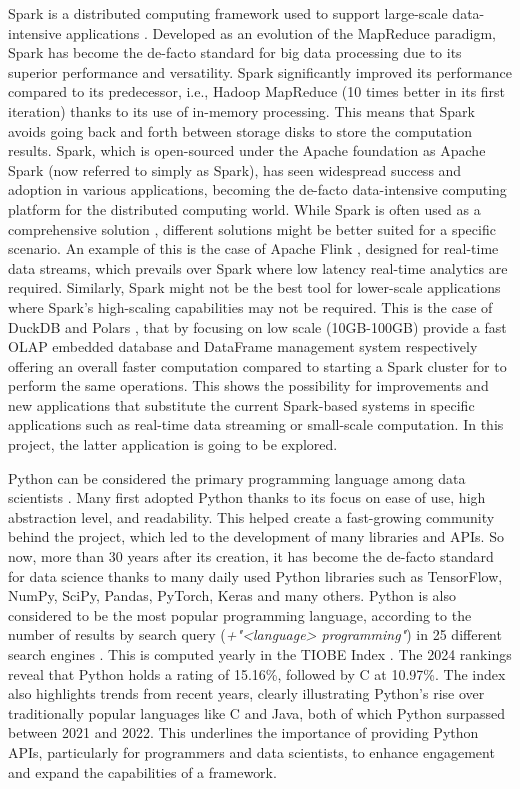 Spark is a distributed computing framework used to support large-scale data-intensive applications \cite{zaharia2010spark}. Developed as an evolution of the MapReduce paradigm, Spark has become the de-facto standard for big data processing due to its superior performance and versatility. Spark significantly improved its performance compared to its predecessor, i.e., Hadoop MapReduce (10 times better in its first iteration) \cite{zaharia2010spark} thanks to its use of in-memory processing. This means that Spark avoids going back and forth between storage disks to store the computation results. Spark, which is open-sourced under the Apache foundation as Apache Spark \cite{ApacheSparkUnified} (now referred to simply as Spark), has seen widespread success and adoption in various applications, becoming the de-facto data-intensive computing platform for the distributed computing world. While Spark is often used as a comprehensive solution \cite{zahariaApacheSparkUnified2016}, different solutions might be better suited for a specific scenario.
An example of this is the case of Apache Flink \cite{carboneApacheFlinkStream}, designed for real-time data streams, which prevails over Spark where low latency real-time analytics are required. Similarly, Spark might not be the best tool for lower-scale applications where Spark's high-scaling capabilities may not be required. This is the case of DuckDB \cite{raasveldtDuckDBEmbeddableAnalytical2019} and Polars \cite{vinkWroteOneFastest2021}, that by focusing on low scale (10GB-100GB) provide a fast \gls{OLAP} embedded database and DataFrame management system respectively offering an overall faster computation compared to starting a Spark cluster for to perform the same operations. This shows the possibility for improvements and new applications that substitute the current Spark-based systems in specific applications such as real-time data streaming or small-scale computation. In this project, the latter application is going to be explored.

Python can be considered the primary programming language among data scientists \cite{Python_CS-R9526}. Many first adopted Python thanks to its focus on ease of use, high abstraction level, and readability. This helped create a fast-growing community behind the project, which led to the development of many libraries and \glspl{API}. So now, more than 30 years after its creation, it has become the de-facto standard for data science thanks to many daily used Python libraries such as TensorFlow, NumPy, SciPy, Pandas, PyTorch, Keras and many others. Python is also considered to be the most popular programming language, according to the number of results by search query (\textit{+"<language> programming"}) in 25 different search engines \cite{TIOBEIndexa}. This is computed yearly in the TIOBE Index \cite{TIOBEIndex}. The 2024 rankings reveal that Python holds a rating of 15.16\%, followed by C at 10.97\%. The index also highlights trends from recent years, clearly illustrating Python's rise over traditionally popular languages like C and Java, both of which Python surpassed between 2021 and 2022. This underlines the importance of providing Python APIs, particularly for programmers and data scientists, to enhance engagement and expand the capabilities of a framework.
